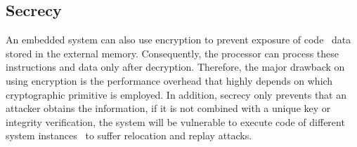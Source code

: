 
\subsection{Secrecy}
\label{subsec:Secrecy}

An embedded system can also use encryption to prevent exposure of code \andor~data stored in the external memory. Consequently, the processor can process these instructions and data only after decryption. Therefore, the major drawback on using encryption is the performance overhead that highly depends on which cryptographic primitive is employed. In addition, secrecy only prevents that an attacker obtains the information, if it is not combined with a unique key or integrity verification, the system will be vulnerable to execute code of different system instances \andor~to suffer relocation and replay attacks.